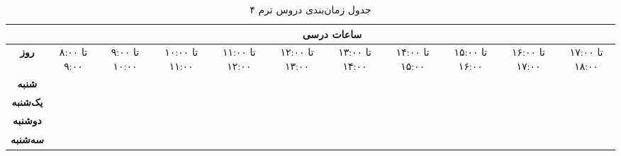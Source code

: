\documentclass{article}
\begin{document}
	
	\begin{sidewaystable}[h]
		\begin{center}	
			\caption{جدول زمان‌بندی دروس ترم ۴}	
			\begin{tabular}{|c|c|c||c|c||c|c||c|c||c|c|}
				\cline{2-11}
				\multicolumn{1}{c}{}
				& \multicolumn{10}{|c|}{\textbf{ساعات درسی}} \\ \hline
                \textbf{روز} & 
                ۸:۰۰ تا ۹:۰۰ & 
                ۹:۰۰ تا ۱۰:۰۰ & 
                ۱۰:۰۰ تا ۱۱:۰۰ & 
                ۱۱:۰۰ تا ۱۲:۰۰ & 
                ۱۲:۰۰ تا ۱۳:۰۰ & 
                ۱۳:۰۰ تا ۱۴:۰۰ &
                ۱۴:۰۰ تا ۱۵:۰۰ & 
                ۱۵:۰۰ تا ۱۶:۰۰ & 
                ۱۶:۰۰ تا ۱۷:۰۰ & 
                ۱۷:۰۰ تا ۱۸:۰۰ \\
				\hline
                \hline
				
				\multirow{5}{*}{\textbf{شنبه}}
				& & & & & & & & & & \\
				\cline{2-11}
				& & & & & & & & & & \\
				\cline{2-11}				
				& & & & & & & & & & \\
				\cline{2-11}
				& & & & & & & & & & \\
				\cline{2-11}				
				& & & & & & & & & & \\
				\hline \hline
				
								\multirow{5}{*}{\textbf{یک‌شنبه}}
				& & & & & & & & & & \\
				\cline{2-11}
				& & & & & & & & & & \\
				\cline{2-11}				
				& & & & & & & & & & \\
				\cline{2-11}
				& & & & & & & & & & \\
				\cline{2-11}				
				& & & & & & & & & & \\
				\hline \hline
				
								\multirow{5}{*}{\textbf{دوشنبه}}
				& & & & & & & & & & \\
				\cline{2-11}
				& & & & & & & & & & \\
				\cline{2-11}				
				& & & & & & & & & & \\
				\cline{2-11}
				& & & & & & & & & & \\
				\cline{2-11}				
				& & & & & & & & & & \\
				\hline \hline
				
								\multirow{5}{*}{\textbf{سه‌شنبه}}
				& & & & & & & & & & \\
				\cline{2-11}
				& & & & & & & & & & \\
				\cline{2-11}				
				& & & & & & & & & & \\
				\cline{2-11}
				& & & & & & & & & & \\
				\cline{2-11}				
				& & & & & & & & & & \\
				\hline \hline
				

\end{tabular}
\end{center}
\end{sidewaystable}
\end{document}
